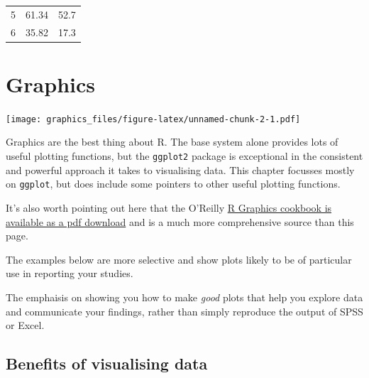 \documentclass[]{article}
\theoremstyle{definition}
\theoremstyle{definition}
\theoremstyle{definition}
\theoremstyle{remark}
\begin{document}
\begin{longtable}[]{@{}ccc@{}}
\begin{minipage}[t]{0.11\columnwidth}
5\strut
\end{minipage} & \begin{minipage}[t]{0.10\columnwidth}\centering\strut
61.34\strut
\end{minipage} & \begin{minipage}[t]{0.10\columnwidth}\centering\strut
52.7\strut
\end{minipage}\tabularnewline
\begin{minipage}[t]{0.11\columnwidth}\centering\strut
6\strut
\end{minipage} & \begin{minipage}[t]{0.10\columnwidth}\centering\strut
35.82\strut
\end{minipage} & \begin{minipage}[t]{0.10\columnwidth}\centering\strut
17.3\strut
\end{minipage}\tabularnewline
\bottomrule
\end{longtable}

\hypertarget{graphics}{\section{Graphics}\label{graphics}}

\texttt{[image: graphics\_files/figure-latex/unnamed-chunk-2-1.pdf]}

Graphics are the best thing about R. The base system alone provides lots
of useful plotting functions, but the \texttt{ggplot2} package is
exceptional in the consistent and powerful approach it takes to
visualising data. This chapter focusses mostly on \texttt{ggplot}, but
does include some pointers to other useful plotting functions.

It's also worth pointing out here that the O'Reilly
\href{https://ase.tufts.edu/bugs/guide/assets/R\%20Graphics\%20Cookbook.pdf}{R
Graphics cookbook is available as a pdf download} and is a much more
comprehensive source than this page.

The examples below are more selective and show plots likely to be of
particular use in reporting your studies.

The emphaisis on showing you how to make \emph{good} plots that help you
explore data and communicate your findings, rather than simply reproduce
the output of SPSS or Excel.

\subsection*{Benefits of visualising data}\label{graphics-benefits}
\end{document}
